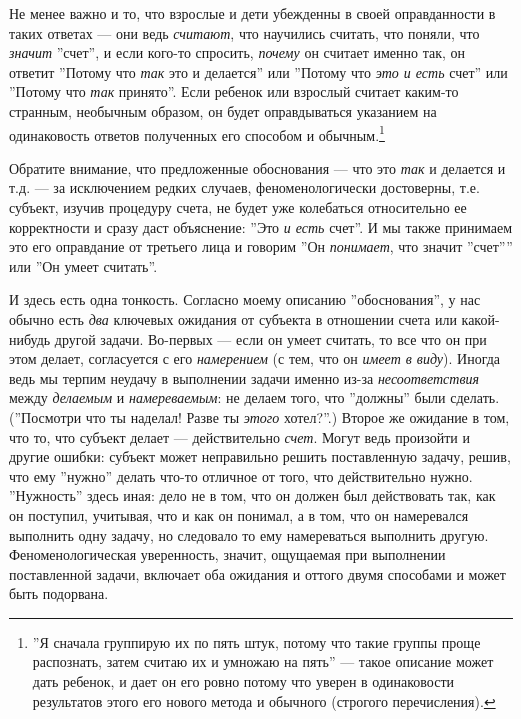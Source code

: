 \documentclass[11pt]{book}
\begin{document}
Не менее важно и то, что взрослые и дети убежденны в своей оправданности в таких ответах --- они ведь \textit{считают}, что научились считать, что поняли, что \textit{значит} ''счет'', и если кого-то спросить, \textit{почему} он считает именно так, он ответит ''Потому что \textit{так} это и делается'' или ''Потому что \textit{это и есть} счет'' или ''Потому что \textit{так} принято''. Если ребенок или взрослый считает каким-то странным, необычным образом, он будет оправдываться указанием на одинаковость ответов полученных его способом и обычным.\footnote{''Я сначала группирую их по пять штук, потому что такие группы проще распознать, затем считаю их и умножаю на пять'' --- такое описание может дать ребенок, и дает он его ровно потому что уверен в одинаковости результатов этого его нового метода и обычного (строгого перечисления).}

Обратите внимание, что предложенные обоснования --- что это \textit{так} и делается и т.д. --- за исключением редких случаев, феноменологически достоверны, т.е. субъект, изучив процедуру счета, не будет уже колебаться относительно ее корректности и сразу даст объяснение: ''Это \textit{и есть} счет''. И мы также принимаем это его оправдание от третьего лица и говорим ''Он \textit{понимает}, что значит ''счет'''' или ''Он умеет считать''.

И здесь есть одна тонкость. Согласно моему описанию ''обоснования'', у нас обычно есть \textit{два} ключевых ожидания от субъекта в отношении счета или какой-нибудь другой задачи. Во-первых --- если он умеет считать, то все что он при этом делает, согласуется с его \textit{намерением} (с тем, что он \textit{имеет в виду}). Иногда ведь мы терпим неудачу в выполнении задачи именно из-за \textit{несоответствия} между \textit{делаемым} и \textit{намереваемым}: не делаем того, что ''должны'' были сделать. (''Посмотри что ты наделал! Разве ты \textit{этого} хотел?''.) Второе же ожидание в том, что то, что субъект делает --- действительно \textit{счет}. Могут ведь произойти и другие ошибки: субъект может неправильно решить поставленную задачу, решив, что ему ''нужно'' делать что-то отличное от того, что действительно нужно. ''Нужность'' здесь иная: дело не в том, что он должен был действовать так, как он поступил, учитывая, что и как он понимал, а в том, что он намеревался выполнить одну задачу, но следовало то ему намереваться выполнить другую. Феноменологическая уверенность, значит, ощущаемая при выполнении поставленной задачи, включает оба ожидания и оттого двумя способами и может быть подорвана.
\end{document}
